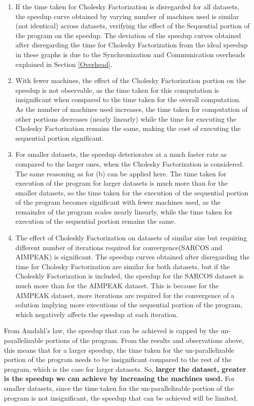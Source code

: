 \documentclass[12pt]{article}
\begin{document}
\begin{enumerate}[label=(\alph*)]
\item If the time taken for Cholesky Factorization is disregarded for all datasets, the speedup curve obtained by varying number of machines used is similar (not identical) across datasets, verifying the effect of the Sequential portion of the program on the speedup. The deviation of the speedup curves obtained after disregarding the time for Cholesky Factorization from the ideal speedup in these graphs is due to the Synchronization and Communication overheads explained in Section \ref{Overhead}.
\item With fewer machines, the effect of the Cholesky Factorization portion on the speedup is not observable, as the time taken for this computation is insignificant when compared to the time taken for the overall computation. As the number of machines used increases, the time taken for computation of other portions decreases (nearly linearly) while the time for executing the Cholesky Factorization remains the same, making the cost of executing the sequential portion significant.
\item For smaller datasets, the speedup deteriorates at a much faster rate as compared to the larger ones, when the Cholesky Factorization is considered. The same reasoning as for (b) can be applied here. The time taken for execution of the program for larger datasets is much more than for the smaller datasets, so the time taken for the execution of the sequential portion of the program becomes significant with fewer machines used, as the remainder of the program scales nearly linearly, while the time taken for execution of the sequential portion remains the same.
\item The effect of Choleskly Factorization on datasets of similar size but requiring different number of iterations required for convergence(SARCOS and AIMPEAK) is significant. The speedup curves obtained after disregarding the time for Cholesky Factorization are similar for both datasets, but if the Choleskly Factorization is included, the speedup for the SARCOS dataset is much more than for the AIMPEAK dataset. This is because for the AIMPEAK dataset, more iterations are required for the convergence of a solution implying more executions of the sequential portion of the program, which negatively affects the speedup at each iteration.
\end{enumerate}
From Amdahl's law, the speedup that can be achieved is capped by the un-parallelizable portions of the program. From the results and observations above, this means that for a larger speedup, the time taken for the un-parallelizable portion of the program needs to be insignificant compared to the rest of the program, which is the case for larger datasets. So, {\bf larger the dataset, greater is the speedup we can achieve by increasing the machines used.} For smaller datasets, since the time taken for the un-parallelizable portion of the program is not insignificant, the speedup that can be achieved will be limited.
\end{document}
